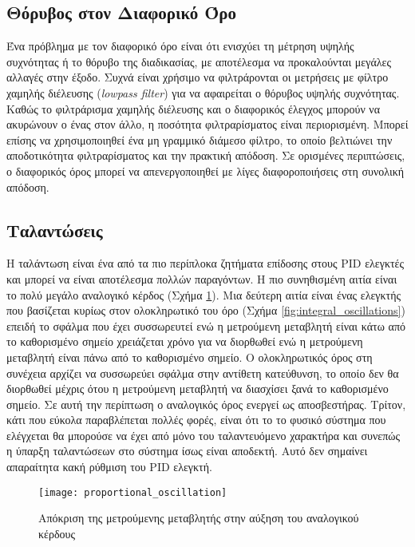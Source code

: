\subsection{Θόρυβος στον Διαφορικό Όρο}

Ένα πρόβλημα με τον διαφορικό όρο είναι ότι ενισχύει τη μέτρηση υψηλής συχνότητας ή το θόρυβο της διαδικασίας, με αποτέλεσμα να προκαλούνται μεγάλες αλλαγές στην έξοδο. Συχνά είναι χρήσιμο να φιλτράρονται οι μετρήσεις με φίλτρο χαμηλής διέλευσης (\emph{lowpass filter}) για να αφαιρείται ο θόρυβος υψηλής συχνότητας. Καθώς το φιλτράρισμα χαμηλής διέλευσης και ο διαφορικός έλεγχος μπορούν να ακυρώνουν ο ένας στον άλλο, η ποσότητα φιλτραρίσματος είναι περιορισμένη. Μπορεί επίσης να χρησιμοποιηθεί ένα μη γραμμικό διάμεσο φίλτρο, το οποίο βελτιώνει την αποδοτικότητα φιλτραρίσματος και την πρακτική απόδοση.
Σε ορισμένες περιπτώσεις, ο διαφορικός όρος μπορεί να απενεργοποιηθεί με λίγες διαφοροποιήσεις στη συνολική απόδοση.

\subsection{Ταλαντώσεις}

Η ταλάντωση είναι ένα από τα πιο περίπλοκα ζητήματα επίδοσης στους PID ελεγκτές και μπορεί να είναι αποτέλεσμα πολλών παραγόντων. Η πιο συνηθισμένη αιτία είναι το πολύ μεγάλο αναλογικό κέρδος (Σχήμα \ref{fig:proportional_oscillation}). Μια δεύτερη αιτία είναι ένας ελεγκτής που βασίζεται κυρίως στον ολοκληρωτικό του όρο (Σχήμα \ref{fig:integral_oscillations}) επειδή το σφάλμα που έχει συσσωρευτεί ενώ η μετρούμενη μεταβλητή είναι κάτω από το καθορισμένο σημείο χρειάζεται χρόνο για να διορθωθεί ενώ η μετρούμενη μεταβλητή είναι πάνω από το καθορισμένο σημείο. Ο ολοκληρωτικός όρος στη συνέχεια αρχίζει να συσσωρεύει σφάλμα στην αντίθετη κατεύθυνση, το οποίο δεν θα διορθωθεί μέχρις ότου η μετρούμενη μεταβλητή να διασχίσει ξανά το καθορισμένο σημείο. Σε αυτή την περίπτωση ο αναλογικός όρος ενεργεί ως αποσβεστήρας. Τρίτον, κάτι που εύκολα παραβλέπεται πολλές φορές, είναι ότι το το φυσικό σύστημα που ελέγχεται θα μπορούσε να έχει από μόνο του ταλαντευόμενο χαρακτήρα και συνεπώς η ύπαρξη ταλαντώσεων στο σύστημα ίσως είναι αποδεκτή. Αυτό δεν σημαίνει απαραίτητα κακή ρύθμιση του PID ελεγκτή.

\begin{figure}[h]
  \centering
  \texttt{[image: proportional\_oscillation]}
  \caption{Απόκριση της μετρούμενης μεταβλητής στην αύξηση του αναλογικού κέρδους}
  \label{fig:proportional_oscillation}
\end{figure}

